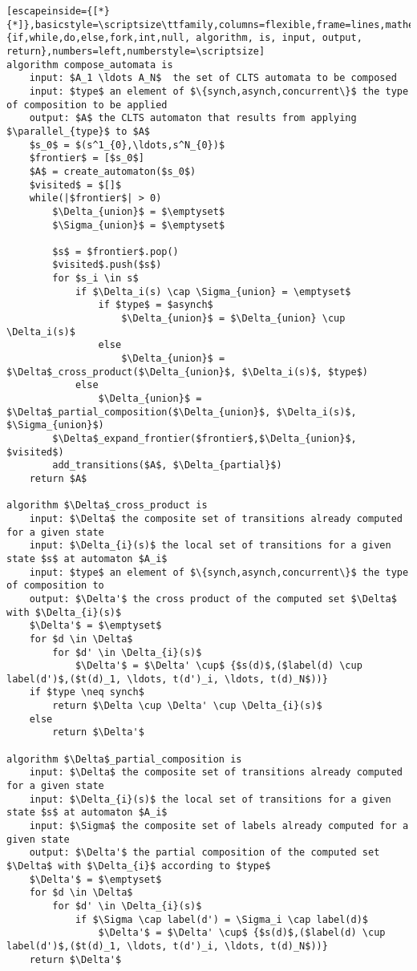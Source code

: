 \renewcommand{\ttdefault}{pcr}
\begin{lstlisting}[escapeinside={[*}{*]},basicstyle=\scriptsize\ttfamily,columns=flexible,frame=lines,mathescape=true,xleftmargin=3.0ex,keywordstyle=\textbf,morekeywords={if,while,do,else,fork,int,null, algorithm, is, input, output, return},numbers=left,numberstyle=\scriptsize]
algorithm compose_automata is
	input: $A_1 \ldots A_N$  the set of CLTS automata to be composed
	input: $type$ an element of $\{synch,asynch,concurrent\}$ the type of composition to be applied
	output: $A$ the CLTS automaton that results from applying $\parallel_{type}$ to $A$
	$s_0$ = $(s^1_{0},\ldots,s^N_{0})$
	$frontier$ = [$s_0$]
	$A$ = create_automaton($s_0$)
	$visited$ = $[]$
	while(|$frontier$| > 0)
		$\Delta_{union}$ = $\emptyset$
		$\Sigma_{union}$ = $\emptyset$		
		
		$s$ = $frontier$.pop()
		$visited$.push($s$)
		for $s_i \in s$ 
			if $\Delta_i(s) \cap \Sigma_{union} = \emptyset$		
				if $type$ = $asynch$
					$\Delta_{union}$ = $\Delta_{union} \cup \Delta_i(s)$
				else
					$\Delta_{union}$ = $\Delta$_cross_product($\Delta_{union}$, $\Delta_i(s)$, $type$)
			else
				$\Delta_{union}$ = $\Delta$_partial_composition($\Delta_{union}$, $\Delta_i(s)$, $\Sigma_{union}$)
		$\Delta$_expand_frontier($frontier$,$\Delta_{union}$, $visited$)				
		add_transitions($A$, $\Delta_{partial}$)
	return $A$

algorithm $\Delta$_cross_product is
	input: $\Delta$ the composite set of transitions already computed for a given state
	input: $\Delta_{i}(s)$ the local set of transitions for a given state $s$ at automaton $A_i$
	input: $type$ an element of $\{synch,asynch,concurrent\}$ the type of composition to	
	output: $\Delta'$ the cross product of the computed set $\Delta$ with $\Delta_{i}(s)$
	$\Delta'$ = $\emptyset$
	for $d \in \Delta$
		for $d' \in \Delta_{i}(s)$
			$\Delta'$ = $\Delta' \cup$ {$s(d)$,($label(d) \cup label(d')$,($t(d)_1, \ldots, t(d')_i, \ldots, t(d)_N$))}
	if $type \neq synch$
		return $\Delta \cup \Delta' \cup \Delta_{i}(s)$
	else
		return $\Delta'$
	
algorithm $\Delta$_partial_composition is
	input: $\Delta$ the composite set of transitions already computed for a given state
	input: $\Delta_{i}(s)$ the local set of transitions for a given state $s$ at automaton $A_i$
	input: $\Sigma$ the composite set of labels already computed for a given state		
	output: $\Delta'$ the partial composition of the computed set $\Delta$ with $\Delta_{i}$ according to $type$
	$\Delta'$ = $\emptyset$
	for $d \in \Delta$
		for $d' \in \Delta_{i}(s)$
			if $\Sigma \cap label(d') = \Sigma_i \cap label(d)$
				$\Delta'$ = $\Delta' \cup$ {$s(d)$,($label(d) \cup label(d')$,($t(d)_1, \ldots, t(d')_i, \ldots, t(d)_N$))}
	return $\Delta'$
				

\end{lstlisting}